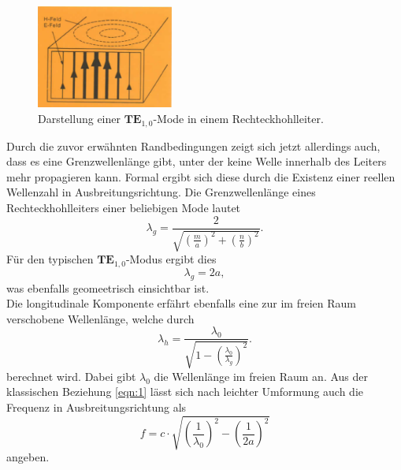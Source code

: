 \begin{figure}
    \centering
    \includegraphics[width=0.4\textwidth]{bilder/mode.png}
    \caption{Darstellung einer $\textbf{TE}_{1,0}$-Mode in einem Rechteckhohlleiter. \cite{skript}} 
    \label{fig:4}
\end{figure}
Durch die zuvor erwähnten Randbedingungen zeigt sich jetzt allerdings auch, dass es eine Grenzwellenlänge gibt, unter der keine Welle innerhalb des Leiters mehr propagieren kann. Formal ergibt sich diese durch die Existenz einer reellen Wellenzahl 
in Ausbreitungsrichtung. 
Die Grenzwellenlänge eines Rechteckhohlleiters einer beliebigen Mode lautet
\begin{equation}
\lambda_{g} = \frac{2}{\sqrt{\left(\frac{m}{a}\right)^2 + \left(\frac{n}{b}\right)^2}}.
\end{equation}
Für den typischen $\textbf{TE}_{1,0}$-Modus ergibt dies 
\begin{equation}
    \lambda_{g} = 2a,
\end{equation}
was ebenfalls geomeetrisch einsichtbar ist.
\\
Die longitudinale Komponente erfährt ebenfalls eine zur im freien Raum verschobene Wellenlänge, welche durch
\begin{equation}
    \lambda_{h} = \frac{\lambda_0}{\sqrt{1 - \left(\frac{\lambda_0}{\lambda_{g}}\right)^2}}.
\end{equation}
berechnet wird. Dabei gibt $\lambda_0$ die Wellenlänge im freien Raum an. Aus der klassischen Beziehung \ref{eqn:1} lässt sich nach leichter Umformung auch die Frequenz in Ausbreitungsrichtung als
\begin{equation}
    f = c \cdot \sqrt{\left(\frac{1}{\lambda_0}\right)^2 - \left(\frac{1}{2a}\right)^2}
\end{equation}
angeben.


